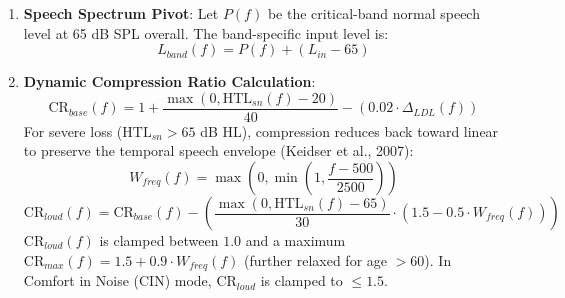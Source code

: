 \documentclass[
  12pt,
]{article}
\begin{document}
\begin{enumerate}
\def\labelenumi{\arabic{enumi}.}
\item
  \textbf{Speech Spectrum Pivot}: Let \(P(f)\) be the critical-band
  normal speech level at 65 dB SPL overall. The band-specific input
  level is: \begin{equation}
  L_{band}(f) = P(f) + (L_{in} - 65)
  \end{equation}
\item
  \textbf{Dynamic Compression Ratio Calculation}: \begin{equation}
  \text{CR}_{base}(f) = 1 + \frac{\max\left(0, \text{HTL}_{sn}(f) - 20\right)}{40} - \left(0.02 \cdot \Delta_{LDL}(f)\right)
  \end{equation} For severe loss (\(\text{HTL}_{sn} > 65\) dB HL),
  compression reduces back toward linear to preserve the temporal speech
  envelope (Keidser et al., 2007): \begin{equation}
  W_{freq}(f) = \max\left(0, \min\left(1, \frac{f - 500}{2500}\right)\right)
  \end{equation} \begin{equation}
  \text{CR}_{loud}(f) = \text{CR}_{base}(f) - \left(\frac{\max(0, \text{HTL}_{sn}(f) - 65)}{30} \cdot (1.5 - 0.5 \cdot W_{freq}(f))\right)
  \end{equation} \(\text{CR}_{loud}(f)\) is clamped between \(1.0\) and
  a maximum \(\text{CR}_{max}(f) = 1.5 + 0.9 \cdot W_{freq}(f)\)
  (further relaxed for age \(> 60\)). In Comfort in Noise (CIN) mode,
  \(\text{CR}_{loud}\) is clamped to \(\le 1.5\).


\end{enumerate}
\end{document}
